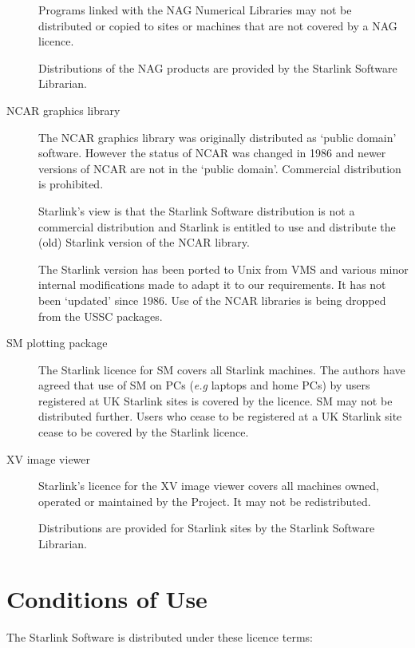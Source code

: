 \documentclass[twoside,11pt]{article}
\newcommand{\xlabel}[1]{}
\renewcommand{\_}{\texttt{\symbol{95}}}
\begin{document}
\begin{description}
Programs linked with the NAG Numerical Libraries may not be distributed 
or copied to sites or machines that are not covered by a NAG licence.

Distributions of the NAG products are provided by the Starlink Software 
Librarian.

\item[NCAR graphics library]\mbox{}

The NCAR graphics library was originally distributed as `public domain'
software.  However the status of NCAR was changed in 1986 and newer
versions of NCAR are not in the `public domain'.  Commercial distribution
is prohibited.

Starlink's view is that the Starlink Software distribution is not a
commercial distribution and Starlink is entitled to use and distribute
the (old) Starlink version of the NCAR library. 

The Starlink version has been ported to Unix from VMS and various minor
internal modifications made to adapt it to our requirements.  It has not
been `updated' since 1986.  Use of the NCAR libraries is being dropped
from the USSC packages.

\item[SM plotting package]\mbox{}

The Starlink licence for SM covers all Starlink machines.  The authors
have agreed that use of SM on PCs (\emph{e.g} laptops and home PCs) by
users registered at UK Starlink sites is covered by the licence.  SM
may not be distributed further.  Users who cease to be registered at a
UK Starlink site cease to be covered by the Starlink licence.


\item[XV image viewer]\mbox{}

Starlink's licence for the XV image viewer covers all machines owned, 
operated or maintained by the Project.  It may not be redistributed.

Distributions are provided for Starlink sites by the Starlink Software
Librarian.

\end{description}

\newpage
\appendix

\section{\xlabel{conditions_of_use}Conditions of Use}
\label{conditions_of_use}

The Starlink Software is distributed under these licence terms:
\end{document}
